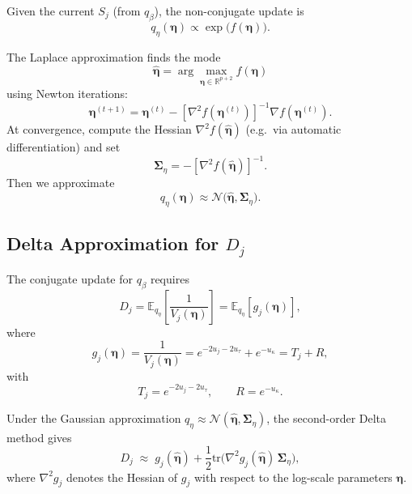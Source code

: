 \documentclass[11pt]{article}
\newcommand{\vect}[1]{\boldsymbol{#1}}
\newcommand{\mat}[1]{\mathbf{#1}}
\newcommand{\E}{\mathbb{E}}
\newcommand{\R}{\mathbb{R}}
\newcommand{\N}{\mathcal{N}}
\begin{document}
Given the current $S_j$ (from $q_\beta$), the non-conjugate update is
\begin{equation}
  q_\eta(\vect{\eta})
  \propto \exp\big(f(\vect{\eta})\big).
\end{equation}

The Laplace approximation finds the mode
\begin{equation}
  \hat{\vect{\eta}} = \arg\max_{\vect{\eta} \in \R^{p+2}} f(\vect{\eta})
\end{equation}
using Newton iterations:
\begin{equation}
  \vect{\eta}^{(t+1)} 
  = \vect{\eta}^{(t)} - \left[\nabla^2 f(\vect{\eta}^{(t)})\right]^{-1} \nabla f(\vect{\eta}^{(t)}).
\end{equation}
At convergence, compute the Hessian $\nabla^2 f(\hat{\vect{\eta}})$ (e.g.\ via automatic differentiation) and set
\begin{equation}
  \mat{\Sigma}_\eta
  = -\left[\nabla^2 f(\hat{\vect{\eta}})\right]^{-1}.
\end{equation}
Then we approximate
\begin{equation}
  q_\eta(\vect{\eta})
  \approx \N\big(\hat{\vect{\eta}}, \mat{\Sigma}_\eta\big).
\end{equation}

\subsection{Delta Approximation for $D_j$}

The conjugate update for $q_\beta$ requires
\begin{equation}
  D_j = \E_{q_\eta}\left[\frac{1}{V_j(\vect{\eta})}\right]
      = \E_{q_\eta}[g_j(\vect{\eta})],
\end{equation}
where
\begin{equation}
  g_j(\vect{\eta}) = \frac{1}{V_j(\vect{\eta})}
  = e^{-2u_j-2u_\tau} + e^{-u_\kappa} = T_j + R,
\end{equation}
with
\begin{equation}
  T_j = e^{-2u_j-2u_\tau}, 
  \qquad
  R   = e^{-u_\kappa}.
\end{equation}

Under the Gaussian approximation $q_\eta \approx \N(\hat{\vect{\eta}},\mat{\Sigma}_\eta)$, the second-order Delta method gives
\begin{equation}
  D_j \;\approx\;
  g_j(\hat{\vect{\eta}})
  + \frac12 \mathrm{tr}\big( \nabla^2 g_j(\hat{\vect{\eta}})\, \mat{\Sigma}_\eta \big),
\end{equation}
where $\nabla^2 g_j$ denotes the Hessian of $g_j$ with respect to the log-scale parameters $\vect{\eta}$.
\end{document}
